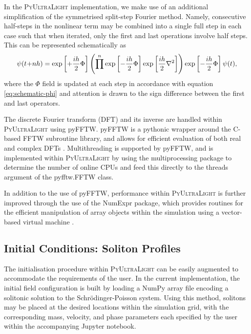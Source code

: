 \documentclass[a4paper,11pt]{article}
\newcommand{\PyUltraLight}{\textsc{PyUltraLight}\xspace}
\begin{document}
In the \PyUltraLight implementation, we make use of an additional simplification of the symmetrised split-step Fourier method. Namely, consecutive half-steps in the nonlinear term may be combined into a single full step in each case such that when iterated, only the first and last operations involve half steps. This can be represented schematically as 
\begin{equation}
    \psi(t\hspace*{-.2em}+\hspace*{-.2em}nh)=\operatorname{exp}\left[+\frac{ih}{2}\Phi\right]\left(\prod^n\operatorname{exp}\left[-\frac{ih}{2}\Phi\right]\operatorname{exp}\left[\frac{ih}{2}\nabla^2\right]\right)\operatorname{exp}\left[-\frac{ih}{2}\Phi\right]\psi(t),
\end{equation}
where the $\Phi$ field is updated at each step in accordance with equation \ref{eq:schematic-phi} and attention is drawn to the sign difference between the first and last operators.

The discrete Fourier transform (DFT) and its inverse are handled within \PyUltraLight using pyFFTW. pyFFTW is a pythonic wrapper around the C-based FFTW subroutine library, and allows for efficient evaluation of both real and complex DFTs \cite{pyfftw} \cite{fftw} \cite{Frigo2005}.  Multithreading is supported by pyFFTW, and is implemented within \PyUltraLight by using the multiprocessing package to determine the number of online CPUs and feed this directly to the threads argument of the pyfftw.FFTW class. 

In addition to the use of pyFFTW, performance within \PyUltraLight is further improved through the use of the NumExpr package, which provides routines for the efficient manipulation of array objects within the simulation using a vector-based virtual machine \cite{numexpr}. 

\subsection{Initial Conditions: Soliton Profiles}\label{sec:soliton-profiles}

The initialisation procedure within \PyUltraLight can be easily augmented to accommodate the requirements of the user. In the current implementation, the initial field configuration is built by loading a NumPy array file encoding a solitonic solution to the Schr{\"o}dinger-Poisson system. Using this method, solitons may be placed at the desired locations within the simulation grid, with the corresponding mass, velocity, and phase parameters each specified by the user within the accompanying Jupyter notebook. 
\end{document}
